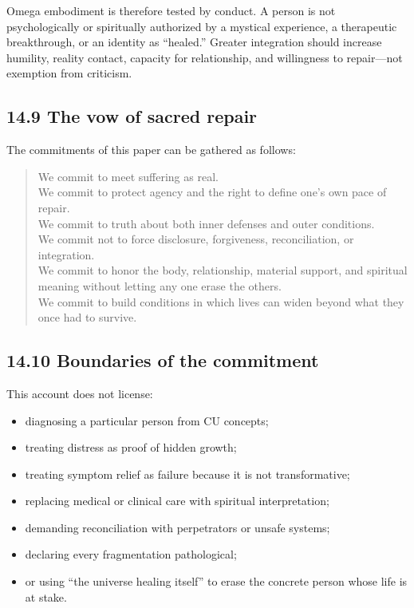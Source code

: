 \documentclass[
  11pt,
]{article}
\providecommand{\tightlist}{%
  \setlength{\itemsep}{0pt}\setlength{\parskip}{0pt}}
\begin{document}
Omega embodiment is therefore tested by conduct. A person is not
psychologically or spiritually authorized by a mystical experience, a
therapeutic breakthrough, or an identity as ``healed.'' Greater
integration should increase humility, reality contact, capacity for
relationship, and willingness to repair---not exemption from criticism.

\subsection{14.9 The vow of sacred
repair}\label{the-vow-of-sacred-repair}

The commitments of this paper can be gathered as follows:

\begin{quote}
We commit to meet suffering as real.\\
We commit to protect agency and the right to define one's own pace of
repair.\\
We commit to truth about both inner defenses and outer conditions.\\
We commit not to force disclosure, forgiveness, reconciliation, or
integration.\\
We commit to honor the body, relationship, material support, and
spiritual meaning without letting any one erase the others.\\
We commit to build conditions in which lives can widen beyond what they
once had to survive.
\end{quote}

\subsection{14.10 Boundaries of the
commitment}\label{boundaries-of-the-commitment}

This account does not license:

\begin{itemize}
\tightlist
\item
  diagnosing a particular person from CU concepts;
\item
  treating distress as proof of hidden growth;
\item
  treating symptom relief as failure because it is not transformative;
\item
  replacing medical or clinical care with spiritual interpretation;
\item
  demanding reconciliation with perpetrators or unsafe systems;
\item
  declaring every fragmentation pathological;
\item
  or using ``the universe healing itself'' to erase the concrete person
  whose life is at stake.
\end{itemize}
\end{document}
